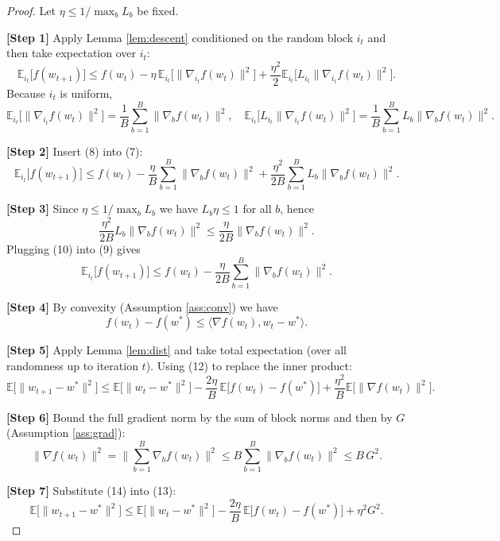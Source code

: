 \documentclass{article}
\newcommand{\E}{\mathbb{E}}
\begin{document}
\begin{proof}
Let $\eta\le 1/\max_{b}L_{b}$ be fixed.  

\noindent\textbf{[Step 1]} Apply Lemma \ref{lem:descent} conditioned on the random block $i_{t}$ and then take expectation over $i_{t}$:
\[
\E_{i_{t}}\!\big[f(w_{t+1})\big]
\le
f(w_{t})
-\eta\,\E_{i_{t}}\!\big[\|\nabla_{i_{t}}f(w_{t})\|^{2}\big]
+\frac{\eta^{2}}{2}\E_{i_{t}}\!\big[L_{i_{t}}\|\nabla_{i_{t}}f(w_{t})\|^{2}\big].
\tag{7}
\]
Because $i_{t}$ is uniform,
\[
\E_{i_{t}}\!\big[\|\nabla_{i_{t}}f(w_{t})\|^{2}\big]
=
\frac{1}{B}\sum_{b=1}^{B}\|\nabla_{b}f(w_{t})\|^{2},
\quad
\E_{i_{t}}\!\big[L_{i_{t}}\|\nabla_{i_{t}}f(w_{t})\|^{2}\big]
=
\frac{1}{B}\sum_{b=1}^{B}L_{b}\|\nabla_{b}f(w_{t})\|^{2}.
\tag{8}
\]

\noindent\textbf{[Step 2]} Insert (8) into (7):
\[
\E_{i_{t}}\!\big[f(w_{t+1})\big]
\le
f(w_{t})
-\frac{\eta}{B}\sum_{b=1}^{B}\|\nabla_{b}f(w_{t})\|^{2}
+\frac{\eta^{2}}{2B}\sum_{b=1}^{B}L_{b}\|\nabla_{b}f(w_{t})\|^{2}.
\tag{9}
\]

\noindent\textbf{[Step 3]} Since $\eta\le 1/\max_{b}L_{b}$ we have $L_{b}\eta\le 1$ for all $b$, hence
\[
\frac{\eta^{2}}{2B}L_{b}\|\nabla_{b}f(w_{t})\|^{2}
\le
\frac{\eta}{2B}\|\nabla_{b}f(w_{t})\|^{2}.
\tag{10}
\]
Plugging (10) into (9) gives
\[
\E_{i_{t}}\!\big[f(w_{t+1})\big]
\le
f(w_{t})
-\frac{\eta}{2B}\sum_{b=1}^{B}\|\nabla_{b}f(w_{t})\|^{2}.
\tag{11}
\]

\noindent\textbf{[Step 4]} By convexity (Assumption \ref{ass:conv}) we have
\[
f(w_{t})-f(w^{*})
\le
\langle\nabla f(w_{t}),w_{t}-w^{*}\rangle .
\tag{12}
\]

\noindent\textbf{[Step 5]} Apply Lemma \ref{lem:dist} and take total expectation (over all randomness up to iteration $t$). Using (12) to replace the inner product:
\[
\E\!\big[\|w_{t+1}-w^{*}\|^{2}\big]
\le
\E\!\big[\|w_{t}-w^{*}\|^{2}\big]
- \frac{2\eta}{B}\,\E\!\big[f(w_{t})-f(w^{*})\big]
+\frac{\eta^{2}}{B}\E\!\big[\|\nabla f(w_{t})\|^{2}\big].
\tag{13}
\]

\noindent\textbf{[Step 6]} Bound the full gradient norm by the sum of block norms and then by $G$ (Assumption \ref{ass:grad}):
\[
\|\nabla f(w_{t})\|^{2}
=
\Big\|\sum_{b=1}^{B}\nabla_{b}f(w_{t})\Big\|^{2}
\le
B\sum_{b=1}^{B}\|\nabla_{b}f(w_{t})\|^{2}
\le
B\,G^{2}.
\tag{14}
\]

\noindent\textbf{[Step 7]} Substitute (14) into (13):
\[
\E\!\big[\|w_{t+1}-w^{*}\|^{2}\big]
\le
\E\!\big[\|w_{t}-w^{*}\|^{2}\big]
- \frac{2\eta}{B}\,\E\!\big[f(w_{t})-f(w^{*})\big]
+ \eta^{2} G^{2}.
\tag{15}
\]


\end{proof}
\end{document}
